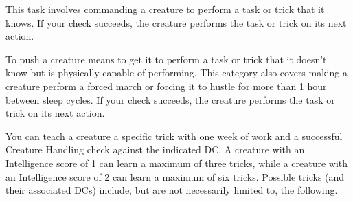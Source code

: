  This task involves commanding a creature to perform a task or trick that it knows. If your check succeeds, the creature performs the task or trick on its next action.

 To push a creature means to get it to perform a task or trick that it doesn't know but is physically capable of performing. This category also covers making a creature perform a forced march or forcing it to hustle for more than 1 hour between sleep cycles. If your check succeeds, the creature performs the task or trick on its next action.

 You can teach a creature a specific trick with one week of work and a successful Creature Handling check against the indicated DC. A creature with an Intelligence score of 1 can learn a maximum of three tricks, while a creature with an Intelligence score of 2 can learn a maximum of six tricks. Possible tricks (and their associated DCs) include, but are not necessarily limited to, the following.

